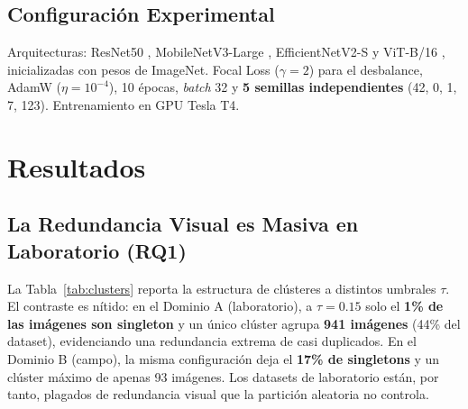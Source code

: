 \documentclass[journal,compsoc]{IEEEtran}
\begin{document}
\subsection{Configuración Experimental}
Arquitecturas: ResNet50 \cite{he2016deep}, MobileNetV3-Large \cite{howard2019searching}, EfficientNetV2-S \cite{tan2019efficientnet, tan2021efficientnetv2} y ViT-B/16 \cite{dosovitskiy2020image}, inicializadas con pesos de ImageNet. Focal Loss ($\gamma=2$) para el desbalance, AdamW ($\eta=10^{-4}$), 10 épocas, \textit{batch} 32 y \textbf{5 semillas independientes} (42, 0, 1, 7, 123). Entrenamiento en GPU Tesla T4.

\section{Resultados}

\subsection{La Redundancia Visual es Masiva en Laboratorio (RQ1)}
La Tabla~\ref{tab:clusters} reporta la estructura de clústeres a distintos umbrales $\tau$. El contraste es nítido: en el Dominio A (laboratorio), a $\tau=0.15$ solo el \textbf{1\% de las imágenes son singleton} y un único clúster agrupa \textbf{941 imágenes} (44\% del dataset), evidenciando una redundancia extrema de casi duplicados. En el Dominio B (campo), la misma configuración deja el \textbf{17\% de singletons} y un clúster máximo de apenas 93 imágenes. Los datasets de laboratorio están, por tanto, plagados de redundancia visual que la partición aleatoria no controla.

\begin{table}[H]
\centering
\caption{Estructura de Clústeres de Redundancia (DINOv2) por Umbral $\tau$}
\label{tab:clusters}
\end{table}
\end{document}
